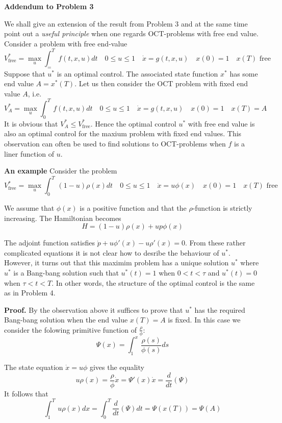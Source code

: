 \documentclass{amsart}
\begin{document}
\bigskip

\centerline{\bf\large
Addendum to Problem 3 }

\bigskip

\noindent
We shall give an extension of the result from Problem 3 and at the same time
point out a \emph{useful principle} when one regards
OCT-problems with free end value.
Consider a problem with free end-value
\[
V^*_{\text{free}}=\max_u\int_=^T\, f(t,x,u)dt\quad
0\leq u\leq 1\quad \dot x=g(t,x,u)\quad x(0)=1\quad x(T)\,\, \text{free}
\]
Suppose that $u^*$ is an optimal control. 
The associated state function $x^*$ has some end value $A=x^*(T)$.
Let us then
consider the OCT problem with fixed end value $A$, i.e.
\[
V^*_A=\max_u\int_0^T\, f(t,x,u)dt\quad
0\leq u\leq 1\quad \dot x=g(t,x,u)\quad x(0)=1\quad x(T)=A
\]
\noindent It is obvious that  $V^*_A\leq
V^*_{\text{free}}$. Hence the optimal control $u^*$
with free end value  is also an optimal control
for the maxium problem with fixed end values.
This observation can often be used
to find solutions  to  OCT-problems when $f$ is a liner function of $u$.
\medskip

\noindent
{\bf An example}
Consider the problem
\[
V^*_{\text{free}}=\max_u\int_0^T\,(1- u)\rho(x)dt \quad
0\leq u\leq 1\quad \dot x=u\phi(x)\quad x(0)=1\quad x(T)\,\, \text{free}
\]

\noindent
We assume that $\phi(x)$ is a positive 
function and that the $\rho$-function
is strictly increasing. The Hamiltonian becomes
\[
H=(1-u)\rho(x)+up\phi(x)
\]

\noindent 
The adjoint function satisfies $\dot p+u\phi'(x)-u\rho'(x)=0$.
From these rather complicated equations 
it is not clear  how to
desribe the behaviour of $u^*$.
However, it turns out that this maximim problem has a unique solution $u^*$
where $u^*$ is a Bang-bang solution such that $u^*(t)=1$ when 
$0<t<\tau$ and $u^*(t)=0$
when $\tau < t< T$. In other words, the structure of the 
optimal control is the same as in Problem 4.
\medskip

\noindent
{\bf Proof.} By the  observation
above it suffices to prove that $u^*$ has the required Bang-bang solution when the end value $x(T)=A$ is fixed. In this case
we consider the folowing primitive function of $\frac{\rho}{\phi}$:
\[ 
\Psi(x)=\int_1^x\,\frac{\rho(s)}{\phi(s)} ds
\]

\noindent
The state equation $\dot x=u\phi$ gives the equality
\[
u\rho(x)=\frac{\rho}{\phi}\dot x=\Psi'(x)\dot x=
\frac{d}{dt}(\Psi)\]
It follows that
\[
\int_1^T\, u\rho(x)dx=\int_0^T
\frac{d}{dt}(\Psi)dt=\Psi(x(T))=\Psi(A)
\]
\end{document}
